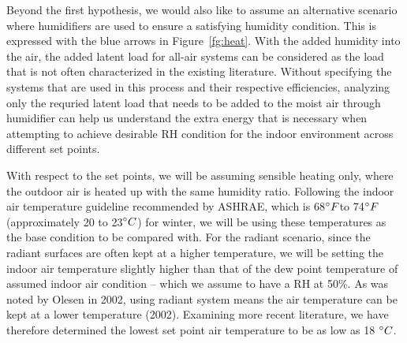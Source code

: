     Beyond the first hypothesis, we would also like to assume an alternative scenario where humidifiers are used to ensure a satisfying humidity condition. This is expressed with the blue arrows in Figure~\ref{fg:heat}. With the added humidity into the air, the added latent load for all-air systems can be considered as the load that is not often characterized in the existing literature. Without specifying the systems that are used in this process and their respective efficiencies, analyzing only the requried latent load that needs to be added to the moist air through humidifier can help us understand the extra energy that is necessary when attempting to achieve desirable RH condition for the indoor environment across different set points. 

    With respect to the set points, we will be assuming sensible heating only, where the outdoor air is heated up with the same humidity ratio. Following the indoor air temperature guideline recommended by ASHRAE, which is 68$\degree F$to 74$\degree F$(approximately 20 to 23$\degree C$) for winter, we will be using these temperatures as the base condition to be compared with. For the radiant scenario, since the radiant surfaces are often kept at a higher temperature, we will be setting the indoor air temperature slightly higher than that of the dew point temperature of assumed indoor air condition – which we assume to have a RH at 50\%. As was noted by Olesen in 2002, using radiant system means the air temperature can be kept at a lower temperature (2002). Examining more recent literature, we have therefore determined the lowest set point air temperature to be as low as 18 $\degree C$. 


